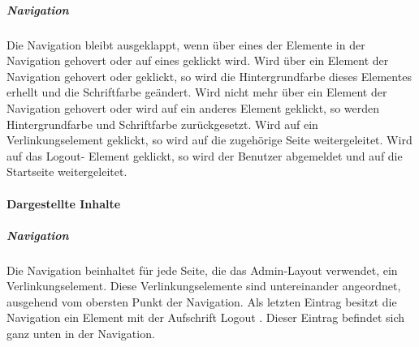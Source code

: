 \subparagraph*{Navigation}
Die Navigation bleibt ausgeklappt, wenn über eines der Elemente in der Navigation gehovert oder auf eines geklickt wird.
Wird über ein Element der Navigation gehovert oder geklickt, so wird die Hintergrundfarbe dieses Elementes erhellt und die Schriftfarbe geändert.
Wird nicht mehr über ein Element der Navigation gehovert oder wird auf ein anderes Element geklickt, so werden Hintergrundfarbe und Schriftfarbe zurückgesetzt.
Wird auf ein Verlinkungselement geklickt, so wird auf die zugehörige Seite weitergeleitet.
Wird auf das \dq Logout\dq - Element geklickt, so wird der Benutzer abgemeldet und auf die Startseite weitergeleitet.

\paragraph*{Dargestellte Inhalte}
\subparagraph*{Navigation}
Die Navigation beinhaltet für jede Seite, die das Admin-Layout verwendet, ein Verlinkungselement. 
Diese Verlinkungselemente sind untereinander angeordnet, ausgehend vom obersten Punkt der Navigation.
Als letzten Eintrag besitzt die Navigation ein Element mit der Aufschrift \dq Logout \dq. Dieser Eintrag befindet sich ganz unten in der Navigation.
